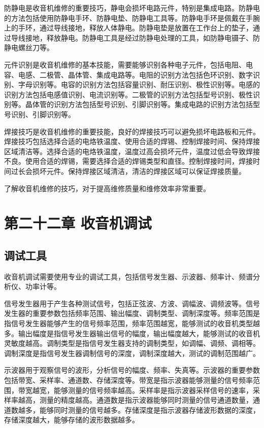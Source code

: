 \documentclass[12pt,UTF8]{ctexbook}
\begin{document}
防静电是收音机维修的重要技巧，静电会损坏电路元件，特别是集成电路。防静电的方法包括使用防静电手环、防静电垫、防静电工具等。防静电手环是佩戴在手腕上的手环，通过导线接地，释放人体静电。防静电垫是放置在工作台上的垫子，通过导线接地，释放静电。防静电工具是经过防静电处理的工具，如防静电镊子、防静电螺丝刀等。

元件识别是收音机维修的基本技能，需要能够识别各种电子元件，包括电阻、电容、电感、二极管、晶体管、集成电路等。电阻的识别方法包括色环识别、数字识别、字母识别等。电容的识别方法包括容量识别、耐压识别、极性识别等。电感的识别方法包括电感值识别、电流识别等。二极管的识别方法包括型号识别、极性识别等。晶体管的识别方法包括型号识别、引脚识别等。集成电路的识别方法包括型号识别、引脚识别等。

焊接技巧是收音机维修的重要技能，良好的焊接技巧可以避免损坏电路板和元件。焊接技巧包括选择合适的电烙铁温度、使用合适的焊锡、控制焊接时间、保持焊接区域清洁等。选择合适的电烙铁温度，温度过高会损坏元件，温度过低会导致焊接不良。使用合适的焊锡，需要选择合适的焊锡类型和直径。控制焊接时间，焊接时间过长会损坏元件。保持焊接区域清洁，清洁的焊接区域可以保证焊接质量。

了解收音机维修的技巧，对于提高维修质量和维修效率非常重要。

\chapter{第二十二章 收音机调试}

\section{调试工具}

收音机调试需要使用专业的调试工具，包括信号发生器、示波器、频率计、频谱分析仪、功率计等。

信号发生器用于产生各种测试信号，包括正弦波、方波、调幅波、调频波等。信号发生器的重要参数包括频率范围、输出幅度、调制类型、调制深度等。频率范围是指信号发生器能够产生的信号频率范围，频率范围越宽，能够测试的收音机类型越多。输出幅度是指信号发生器输出信号的幅度，输出幅度越大，能够测试的收音机灵敏度越高。调制类型是指信号发生器支持的调制类型，如调幅、调频、调相等。调制深度是指信号发生器调制信号的深度，调制深度越大，测试的调制范围越广。

示波器用于观察信号的波形，分析信号的幅度、频率、失真等。示波器的重要参数包括带宽、采样率、通道数、存储深度等。带宽是指示波器能够测量的信号频率范围，带宽越宽，能够测量的信号频率越高。采样率是指示波器采样信号的速率，采样率越高，测量的精度越高。通道数是指示波器能够同时测量的信号通道数量，通道数越多，能够同时测量的信号越多。存储深度是指示波器存储波形数据的深度，存储深度越大，能够存储的波形数据越多。
\end{document}
